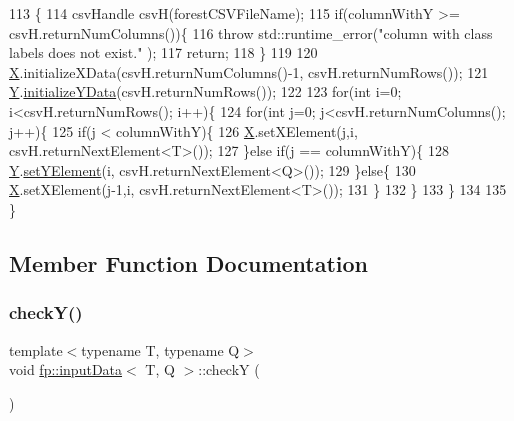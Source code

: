 \begin{DoxyCode}
113         \{
114             csvHandle csvH(forestCSVFileName);
115             \textcolor{keywordflow}{if}(columnWithY >= csvH.returnNumColumns())\{
116                 \textcolor{keywordflow}{throw} std::runtime\_error(\textcolor{stringliteral}{"column with class labels does not exist."} );
117                 \textcolor{keywordflow}{return};
118             \}
119 
120             \hyperlink{classfp_1_1inputData_ad19581a60d2af60ebd3c8be5ac5ad95e}{X}.initializeXData(csvH.returnNumColumns()-1, csvH.returnNumRows());
121             \hyperlink{classfp_1_1inputData_a2ec8c0c7b9a8e114673c703edea4283d}{Y}.\hyperlink{classfp_1_1inputYData_a9bb60b2b0070ae39ad53088f1bcf9e87}{initializeYData}(csvH.returnNumRows());
122 
123             \textcolor{keywordflow}{for}(\textcolor{keywordtype}{int} i=0; i<csvH.returnNumRows(); i++)\{
124                 \textcolor{keywordflow}{for}(\textcolor{keywordtype}{int} j=0; j<csvH.returnNumColumns(); j++)\{
125                     \textcolor{keywordflow}{if}(j < columnWithY)\{
126                         \hyperlink{classfp_1_1inputData_ad19581a60d2af60ebd3c8be5ac5ad95e}{X}.setXElement(j,i, csvH.returnNextElement<T>());
127                     \}\textcolor{keywordflow}{else} \textcolor{keywordflow}{if}(j == columnWithY)\{
128                         \hyperlink{classfp_1_1inputData_a2ec8c0c7b9a8e114673c703edea4283d}{Y}.\hyperlink{classfp_1_1inputYDataClassification_a421b4107615668eebf7bf447fb99ecc5}{setYElement}(i, csvH.returnNextElement<Q>());
129                     \}\textcolor{keywordflow}{else}\{
130                         \hyperlink{classfp_1_1inputData_ad19581a60d2af60ebd3c8be5ac5ad95e}{X}.setXElement(j-1,i, csvH.returnNextElement<T>());
131                     \}
132                 \}
133             \}
134 
135         \}
\end{DoxyCode}


\subsection{Member Function Documentation}
\mbox{\label{classfp_1_1inputData_a75ee69b1a4e16a5ceb54064c4f6f2d47}} 
\subsubsection{\texorpdfstring{check\+Y()}{checkY()}}
{\footnotesize\ttfamily template$<$typename T, typename Q$>$ \\
void \hyperlink{classfp_1_1inputData}{fp\+::input\+Data}$<$ T, Q $>$\+::checkY (\begin{DoxyParamCaption}{ }\end{DoxyParamCaption})\hspace{0.3cm}{\ttfamily [inline]}}



